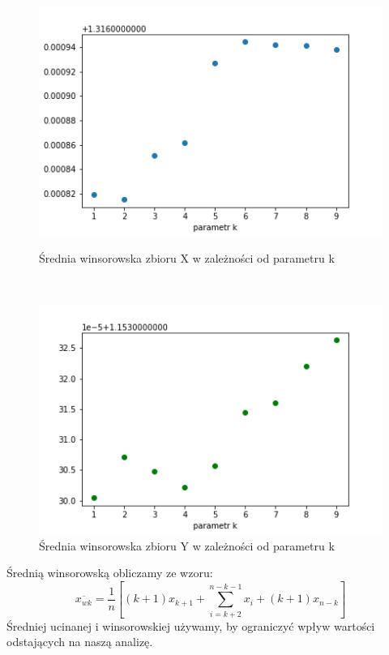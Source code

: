 \documentclass[12pt]{mwart}
\begin{document}
\begin{figure}[H]
	\begin{minipage}{.5\linewidth}
		\centering
		\includegraphics[scale=0.7]{X_wins.PNG}
		\caption{Średnia winsorowska zbioru X w zależności od parametru k}
	\end{minipage}
	$\quad$
	\begin{minipage}{.5\linewidth}
		\centering
		\includegraphics[scale=0.7]{Y_wins.PNG}
		\caption{Średnia winsorowska zbioru Y w zależności od parametru k}
	\end{minipage}
\end{figure}
Średnią winsorowską obliczamy ze wzoru: 
\begin{equation}
	\overline{x_{wk}} = \frac{1}{n}\left[(k+1)x_{k+1}+\sum\limits_{i=k+2}^{n-k-1}x_i + (k+1)x_{n-k}\right]	
\end{equation}
Średniej ucinanej i winsorowskiej używamy, by ograniczyć wpływ wartości odstających na naszą analizę.
\end{document}
